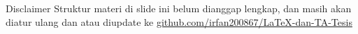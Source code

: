 \documentclass[11pt,            %
               aspectratio=169, %
               xcolor=svgnames,
               t                %
               ]{beamer}
\begin{document}
%
%
%
%
%
%
%
%
%
%
%


\begin{frame}{Disclaimer}
\label{disclaimer}
Struktur materi di slide ini belum dianggap lengkap, dan masih akan diatur ulang dan atau diupdate ke \href{https://github.com/irfan200867/LaTeX-dan-TA-Tesis}{github.com/irfan200867/LaTeX-dan-TA-Tesis}
\end{frame}
\end{document}
